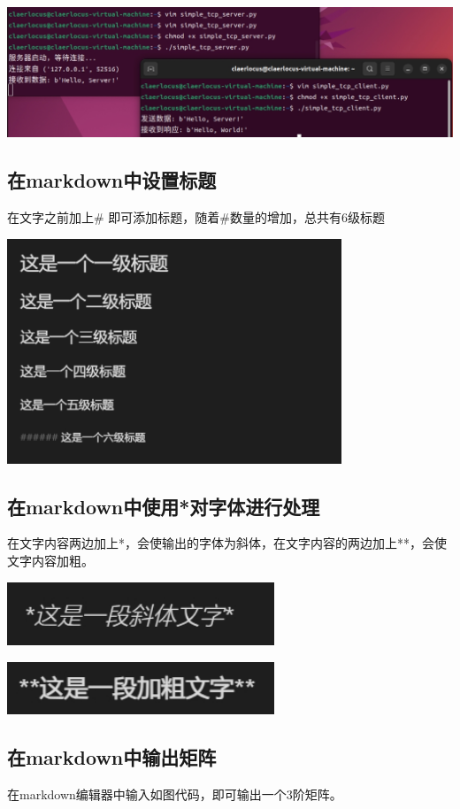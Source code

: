 \documentclass[UTF8,a4paper]{ctexart}
\begin{document}
\begin{sloppypar}
	\includegraphics[width = 14cm]{25}
	
	\subsection{在markdown中设置标题}
	在文字之前加上\# 即可添加标题，随着\#数量的增加，总共有6级标题
	
	\includegraphics[width = 10cm]{26}
	
	\subsection{在markdown中使用*对字体进行处理}
	在文字内容两边加上*，会使输出的字体为斜体，在文字内容的两边加上**，会使文字内容加粗。
	
	\includegraphics[width = 8cm]{27}
	
	\includegraphics[width = 8cm]{28}
	
	\subsection{在markdown中输出矩阵}
	在markdown编辑器中输入如图代码，即可输出一个3阶矩阵。
	

\end{sloppypar}
\end{document}
